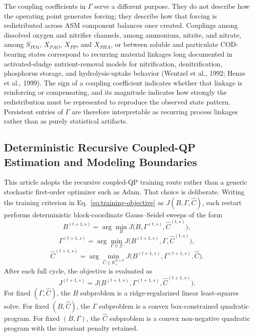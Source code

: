 \documentclass[a4paper,fleqn]{cas-sc}
\newenvironment{revblock}{\begingroup\color{revDefault}}{\endgroup}
\newenvironment{revblockr127}{\begingroup\color{revRoneTwentySeven}}{\endgroup}
\begin{document}
\begin{revblock}
The coupling coefficients in $\Gamma$ serve a different purpose. They do not describe how the operating point generates forcing; they describe how that forcing is redistributed across ASM component balances once created. Couplings among dissolved oxygen and nitrifier channels, among ammonium, nitrite, and nitrate, among $S_{PO4}$, $X_{PAO}$, $X_{PP}$, and $X_{PHA}$, or between soluble and particulate COD-bearing states correspond to recurring material linkages long documented in activated-sludge nutrient-removal models for nitrification, denitrification, phosphorus storage, and hydrolysis-uptake behavior (Wentzel et al., 1992; Henze et al., 1999). The sign of a coupling coefficient indicates whether that linkage is reinforcing or compensating, and its magnitude indicates how strongly the redistribution must be represented to reproduce the observed state pattern. Persistent entries of $\Gamma$ are therefore interpretable as recurring process linkages rather than as purely statistical artifacts.

\begin{revblockr127}
\subsection{Deterministic Recursive Coupled-QP Estimation and Modeling Boundaries}

This article adopts the recursive coupled-QP training route rather than a generic stochastic first-order optimizer such as Adam. That choice is deliberate. Writing the training criterion in Eq.~\eqref{eq:training-objective} as $J(B,\Gamma,\widehat{C})$, each restart performs deterministic block-coordinate Gauss--Seidel sweeps of the form
\begin{equation}
\label{eq:recursive-update-b}
B^{(t+1,s)} = \arg\min_{B} J\bigl(B, \Gamma^{(t,s)}, \widehat{C}^{(t,s)}\bigr),
\end{equation}
\begin{equation}
\label{eq:recursive-update-gamma}
\Gamma^{(t+1,s)} = \arg\min_{\Gamma \in \mathcal{G}} J\bigl(B^{(t+1,s)}, \Gamma, \widehat{C}^{(t,s)}\bigr),
\end{equation}
\begin{equation}
\label{eq:recursive-update-chat}
\widehat{C}^{(t+1,s)} = \arg\min_{\widehat{C} \in \mathbb{R}_{+}^{N \times F}} J\bigl(B^{(t+1,s)}, \Gamma^{(t+1,s)}, \widehat{C}\bigr).
\end{equation}
After each full cycle, the objective is evaluated as
\begin{equation}
\label{eq:recursive-update-objective}
J^{(t+1,s)} = J\bigl(B^{(t+1,s)}, \Gamma^{(t+1,s)}, \widehat{C}^{(t+1,s)}\bigr).
\end{equation}
For fixed $(\Gamma, \widehat{C})$, the $B$ subproblem is a ridge-regularized linear least-squares solve. For fixed $(B, \widehat{C})$, the $\Gamma$ subproblem is a convex box-constrained quadratic program. For fixed $(B, \Gamma)$, the $\widehat{C}$ subproblem is a convex non-negative quadratic program with the invariant penalty retained.


\end{revblockr127}
\end{revblock}
\end{document}

